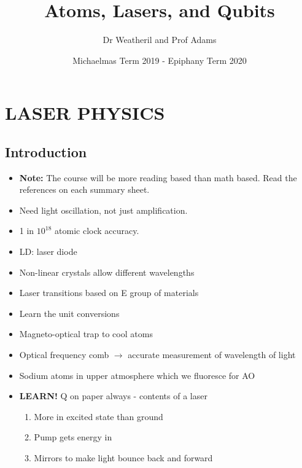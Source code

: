 \documentclass[a4paper, 11pt, normalem]{report}
\title{Atoms, Lasers, and Qubits \vspace{-20pt}}
\author{Dr Weatheril and Prof Adams}
\date{\vspace{-15pt}Michaelmas Term 2019 - Epiphany Term 2020}
\newcommand*\initfamily{\usefont{U}{Starburst}{xl}{n}}
\begin{document}
\maketitle
\tableofcontents

\part{\initfamily LASER PHYSICS}
\chapter{Introduction}
\begin{itemize}
    \item \textbf{Note:} The course will be more reading based than math based. 
Read the references on each summary sheet. 
    \item Need light oscillation, not just amplification.  
    \item 1 in $10^{18}$ atomic clock accuracy.
    \item LD: laser diode
    \item Non-linear crystals allow different wavelengths
    \item Laser transitions based on E group of materials
    \item Learn the unit conversions
    \item Magneto-optical trap to cool atoms
    \item Optical frequency comb $\to$ accurate measurement of wavelength of light 
    \item Sodium atoms in upper atmosphere which we fluoresce for AO
    \item \textbf{LEARN!} Q on paper always - contents of a laser
        \begin{enumerate}
            \item More in excited state than ground
            \item Pump gets energy in
            \item Mirrors to make light bounce back and forward
        \end{enumerate}
\end{itemize}
\end{document}
